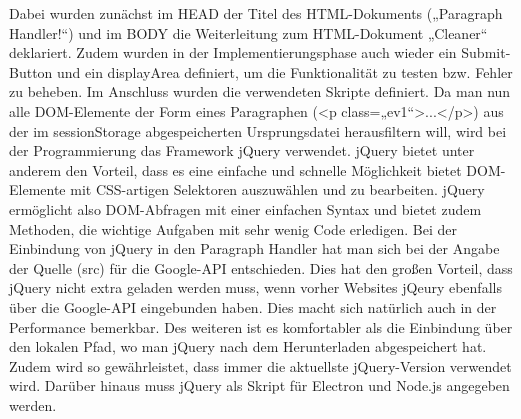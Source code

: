 {Dabei wurden zunächst im HEAD der Titel des HTML-Dokuments („Paragraph Handler!“) und im BODY die Weiterleitung zum HTML-Dokument „Cleaner“ deklariert. Zudem wurden in der Implementierungsphase auch wieder ein Submit-Button und ein displayArea definiert, um die Funktionalität zu testen bzw. Fehler zu beheben. Im Anschluss wurden die verwendeten Skripte definiert. Da man nun alle DOM-Elemente der Form eines Paragraphen (<p class=„ev1“>...</p>) aus der im sessionStorage abgespeicherten Ursprungsdatei herausfiltern will, wird bei der Programmierung das Framework jQuery verwendet. jQuery bietet unter anderem den Vorteil, dass es eine einfache und schnelle Möglichkeit bietet DOM-Elemente mit CSS-artigen Selektoren auszuwählen und zu bearbeiten. jQuery ermöglicht also DOM-Abfragen mit einer einfachen Syntax und bietet zudem Methoden, die wichtige Aufgaben mit sehr wenig Code erledigen. Bei der Einbindung von jQuery in den Paragraph Handler hat man sich bei der Angabe der Quelle (src) für die Google-API entschieden. Dies hat den großen Vorteil, dass jQuery nicht extra geladen werden muss, wenn vorher Websites jQeury ebenfalls über die Google-API eingebunden haben. Dies macht sich natürlich auch in der Performance bemerkbar. Des weiteren ist es komfortabler als die Einbindung über den lokalen Pfad, wo man jQuery nach dem Herunterladen abgespeichert hat. Zudem wird so gewährleistet, dass immer die aktuellste jQuery-Version verwendet wird. Darüber hinaus muss jQuery als Skript für Electron und Node.js angegeben werden. 

}
